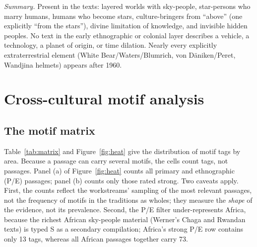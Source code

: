 \documentclass[11pt,a4paper]{article}
\begin{document}
\emph{Summary.} Present in the texts: layered worlds with sky-people, star-persons who marry humans, humans who become stars, culture-bringers from ``above'' (one explicitly ``from the stars''), divine limitation of knowledge, and invisible hidden peoples. No text in the early ethnographic or colonial layer describes a vehicle, a technology, a planet of origin, or time dilation. Nearly every explicitly extraterrestrial element (White Bear/Waters/Blumrich, von Däniken/Peret, Wandjina helmets) appears after 1960.

\section{Cross-cultural motif analysis}\label{sec:crosscultural}

\subsection{The motif matrix}

Table~\ref{tab:matrix} and Figure~\ref{fig:heat} give the distribution of motif tags by area. Because a passage can carry several motifs, the cells count tags, not passages. Panel (a) of Figure~\ref{fig:heat} counts all primary and ethnographic (P/E) passages; panel (b) counts only those rated strong. Two caveats apply. First, the counts reflect the workstreams' sampling of the most relevant passages, not the frequency of motifs in the traditions as wholes; they measure the \emph{shape} of the evidence, not its prevalence. Second, the P/E filter under-represents Africa, because the richest African sky-people material (Werner's Chaga and Rwandan texts) is typed S as a secondary compilation; Africa's strong P/E row contains only 13 tags, whereas all African passages together carry 73.
\end{document}
